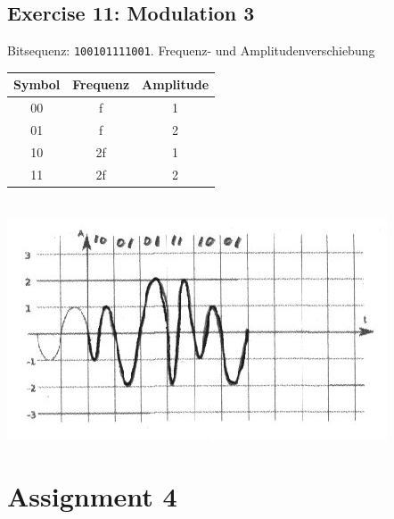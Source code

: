 \documentclass[10pt,a4paper]{scrartcl}
\begin{document}
\subsection*{Exercise 11: Modulation 3}
Bitsequenz: \texttt{100101111001}. Frequenz- und Amplitudenverschiebung\\
\begin{tabular}{|c|c|c|}
\hline Symbol & Frequenz & Amplitude \\ 
\hline 00 & f & 1 \\ 
\hline 01 & f & 2 \\ 
\hline 10 & 2f & 1 \\ 
\hline 11 & 2f & 2 \\ 
\hline 
\end{tabular} \\
\includegraphics[scale=2]{a3e11.jpg}

\section*{Assignment 4}
\end{document}
